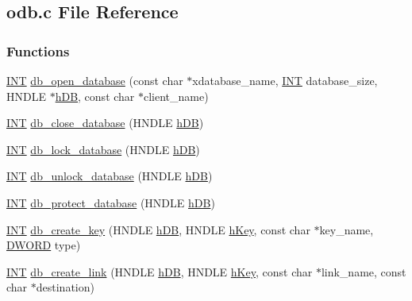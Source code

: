 \subsection{odb.c File Reference}
\label{odb_8c}
\subsubsection*{Functions}
\begin{DoxyCompactItemize}
\item 
\hyperlink{vppg_8h_a392e62da233ed3e2f7c3fd4f487a3896}{INT} \hyperlink{group__odbfunctionc_gaece9851974b00231428f82b341e2c523}{db\_\-open\_\-database} (const char $\ast$xdatabase\_\-name, \hyperlink{vppg_8h_a392e62da233ed3e2f7c3fd4f487a3896}{INT} database\_\-size, HNDLE $\ast$\hyperlink{mevb_8c_ab1f60c53f74e806a3b9f687af38d7421}{hDB}, const char $\ast$client\_\-name)
\item 
\hyperlink{vppg_8h_a392e62da233ed3e2f7c3fd4f487a3896}{INT} \hyperlink{group__odbfunctionc_gadbb92e13899bbffc584b676bb924586e}{db\_\-close\_\-database} (HNDLE \hyperlink{mevb_8c_ab1f60c53f74e806a3b9f687af38d7421}{hDB})
\item 
\hyperlink{vppg_8h_a392e62da233ed3e2f7c3fd4f487a3896}{INT} \hyperlink{group__odbfunctionc_ga299048aeed427690630027aa5aebc451}{db\_\-lock\_\-database} (HNDLE \hyperlink{mevb_8c_ab1f60c53f74e806a3b9f687af38d7421}{hDB})
\item 
\hyperlink{vppg_8h_a392e62da233ed3e2f7c3fd4f487a3896}{INT} \hyperlink{group__odbfunctionc_ga52885112dd8f2acc551ac0610d7f552d}{db\_\-unlock\_\-database} (HNDLE \hyperlink{mevb_8c_ab1f60c53f74e806a3b9f687af38d7421}{hDB})
\item 
\hyperlink{vppg_8h_a392e62da233ed3e2f7c3fd4f487a3896}{INT} \hyperlink{group__odbfunctionc_ga959637b6837f613af5a8a3df52af6f3b}{db\_\-protect\_\-database} (HNDLE \hyperlink{mevb_8c_ab1f60c53f74e806a3b9f687af38d7421}{hDB})
\item 
\hyperlink{vppg_8h_a392e62da233ed3e2f7c3fd4f487a3896}{INT} \hyperlink{group__odbfunctionc_ga4dcab15e47980882e35bddf3ceb9aee5}{db\_\-create\_\-key} (HNDLE \hyperlink{mevb_8c_ab1f60c53f74e806a3b9f687af38d7421}{hDB}, HNDLE \hyperlink{mevb_8c_a8cd567d23219ba7fc83280cf20caf1c2}{hKey}, const char $\ast$key\_\-name, \hyperlink{vt2_8h_a798af1e30bc65f319c1a246cecf59e39}{DWORD} type)
\item 
\hyperlink{vppg_8h_a392e62da233ed3e2f7c3fd4f487a3896}{INT} \hyperlink{group__odbfunctionc_ga3da25029b1835ef605483b91684704f6}{db\_\-create\_\-link} (HNDLE \hyperlink{mevb_8c_ab1f60c53f74e806a3b9f687af38d7421}{hDB}, HNDLE \hyperlink{mevb_8c_a8cd567d23219ba7fc83280cf20caf1c2}{hKey}, const char $\ast$link\_\-name, const char $\ast$destination)

\end{DoxyCompactItemize}
